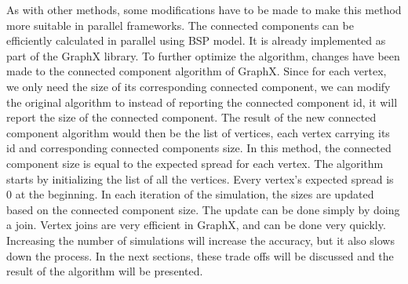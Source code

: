\documentclass[english]{tktltiki}
\begin{document}
As with other methods, some modifications have to be made to make this method more suitable in parallel frameworks. The connected components can be efficiently calculated in parallel using BSP model. It is already implemented as part of the GraphX library. To further optimize the algorithm, changes have been made to the connected component algorithm of GraphX. Since for each vertex, we only need the size of its corresponding connected component, we can modify the original algorithm to instead of reporting the connected component id, it will report the size of the connected component. The result of the new connected component algorithm would then be the list of vertices, each vertex carrying its id and corresponding connected components size. In this method, the connected component size is equal to the expected spread for each vertex. The algorithm starts by initializing the list of all the vertices. Every vertex's expected spread is 0 at the beginning. In each iteration of the simulation, the sizes are updated based on the connected component size. The update can be done simply by doing a join. Vertex joins are very efficient in GraphX, and can be done very quickly. Increasing the number of simulations will increase the accuracy, but it also slows down the process. In the next sections, these trade offs will be discussed and the result of the algorithm will be presented.
\end{document}

